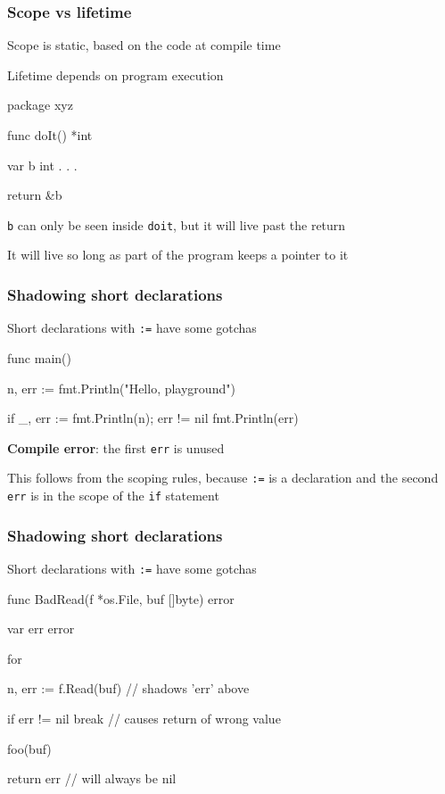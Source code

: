 \documentclass[handout,compress,t,11pt]{beamer}
\begin{document}
\begin{frame}[fragile]
    \frametitle{Scope vs lifetime}
    Scope is static, based on the code at compile time \par
\vspace{0.4\baselineskip}
    Lifetime depends on program execution
\begin{golang}
package xyz

func doIt() *int {
    var b int
    . . .
    
    return &b
}
\end{golang}
\vspace{0.4\baselineskip}
\verb|b| can only be seen inside \verb|doit|, but it will live past the return \par
\vspace{0.6\baselineskip}
It will live so long as part of the program keeps a pointer to it
\end{frame}

\begin{frame}[fragile]
    \frametitle{Shadowing short declarations}
    Short declarations with \verb|:=| have some gotchas \par
\begin{golang}
func main() {
	n, err := fmt.Println("Hello, playground")

	if _, err := fmt.Println(n); err != nil {
	    fmt.Println(err)
	}
}
\end{golang}
    \vspace{\baselineskip}
{\bf Compile error}: the first \verb|err| is unused \par
\vspace{0.6\baselineskip}
This follows from the scoping rules, because \verb|:=| is a declaration
and the second \verb|err| is in the scope of the \verb|if| statement
\end{frame}

\begin{frame}[fragile]
    \frametitle{Shadowing short declarations}
    Short declarations with \verb|:=| have some gotchas \par
\begin{golang}
func BadRead(f *os.File, buf []byte) error {
	var err error

	for {
		n, err := f.Read(buf) // shadows 'err' above

		if err != nil {
			break // causes return of wrong value
		}

		foo(buf)
	}

	return err // will always be nil
}
\end{golang}
\end{frame}
\end{document}
